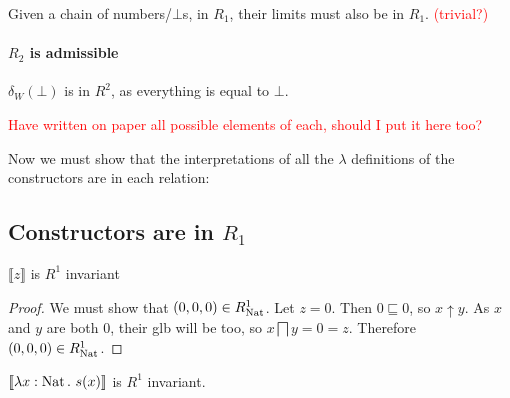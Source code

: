 Given a chain of numbers/$\bot$s, in $R_1$, their limits must also be in $R_1$. \textcolor{red}{(trivial?)}

\paragraph{$R_2$ is admissible}

$\delta_W(\bot)$ is in $R^2$, as everything is equal to $\bot$.

\textcolor{red}{Have written on paper all possible elements of each, should I put it here too?}

Now we must show that the interpretations of all the $\lambda$ definitions of the constructors are in each relation:

\subsection{Constructors are in $R_1$}

\begin{lem}
$\llbracket z \rrbracket$ is $R^1$ invariant
\end{lem}

\vspace{0.25cm}

\begin{proof} We must show that $(0,0,0) \in R_{\operatorname{Nat}}^1$. Let $z = 0$. Then $0 \sqsubseteq 0$, so $x \uparrow y$. As $x$ and $y$ are both $0$, their glb will be too, so $x \bigsqcap y = 0 = z$. Therefore $(0,0,0) \in R_{\operatorname{Nat}}^1$.
\end{proof}

\vspace{0.5cm}

\begin{lem}
$\llbracket \lambda x : \operatorname{Nat} . \ s(x) \rrbracket$ is $R^1$ invariant.
\end{lem}

\vspace{0.25cm}

